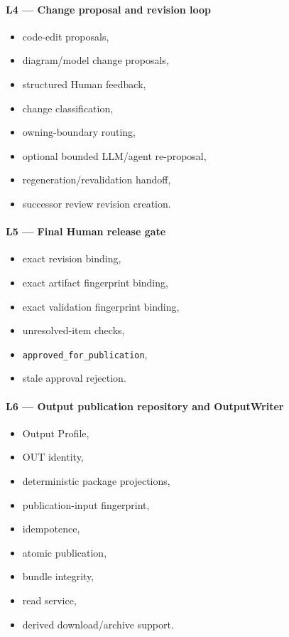 \hypertarget{l4--change-proposal-and-revision-loop}{%
\paragraph{L4 --- Change proposal and revision loop}\label{l4--change-proposal-and-revision-loop}}

\begin{itemize}
\tightlist
\item
  code-edit proposals,
\item
  diagram/model change proposals,
\item
  structured Human feedback,
\item
  change classification,
\item
  owning-boundary routing,
\item
  optional bounded LLM/agent re-proposal,
\item
  regeneration/revalidation handoff,
\item
  successor review revision creation.
\end{itemize}

\hypertarget{l5--final-human-release-gate}{%
\paragraph{L5 --- Final Human release gate}\label{l5--final-human-release-gate}}

\begin{itemize}
\tightlist
\item
  exact revision binding,
\item
  exact artifact fingerprint binding,
\item
  exact validation fingerprint binding,
\item
  unresolved-item checks,
\item
  \texttt{approved\_for\_publication},
\item
  stale approval rejection.
\end{itemize}

\hypertarget{l6--output-publication-repository-and-outputwriter}{%
\paragraph{L6 --- Output publication repository and OutputWriter}\label{l6--output-publication-repository-and-outputwriter}}

\begin{itemize}
\tightlist
\item
  Output Profile,
\item
  OUT identity,
\item
  deterministic package projections,
\item
  publication-input fingerprint,
\item
  idempotence,
\item
  atomic publication,
\item
  bundle integrity,
\item
  read service,
\item
  derived download/archive support.
\end{itemize}

